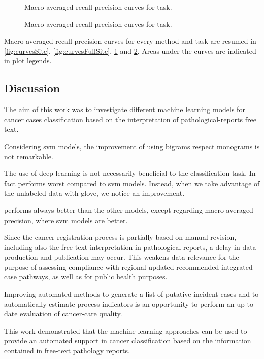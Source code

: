 \begin{figure}
  \centering
  \resizebox{0.9\textwidth}{!}{}
  \caption{Macro-averaged recall-precision curves for \type{} task.}
  \label{fig:curvesType}
\end{figure}

\begin{figure}
  \centering
  \resizebox{0.9\textwidth}{!}{}
  \caption{Macro-averaged recall-precision curves for \behaviour{} task.}
  \label{fig:curvesBehaviour}
\end{figure}

Macro-averaged recall-precision curves for every method and task are
resumed in \cref{fig:curvesSite}, \cref{fig:curvesFullSite},
\cref{fig:curvesType} and
\cref{fig:curvesBehaviour}. Areas under the curves are indicated in
plot legends.

\subsection{Discussion}
The aim of this work was to investigate different machine learning
models for cancer cases classification based on the interpretation
of pathological-reports free text.

Considering \ac{svm} models, the improvement of using
bigrams respect monograms is not remarkable.

The use of deep learning is not necessarily beneficial to the
classification task. In fact \lstmng{}
performs worst compared to \ac{svm} models. Instead, when we take
advantage of the unlabeled data with \ac{glove}, we notice an
improvement.

\lstmb{} performs always better than the other models, except
regarding macro-averaged precision, where \ac{svm} models are better.

Since the cancer registration process is partially based on manual
revision, including also the free text interpretation in pathological
reports, a delay in data production and publication may occur. This
weakens data relevance for the purpose of assessing compliance with
regional updated recommended integrated case pathways, as well as for
public health purposes.

Improving automated methods to generate a list of putative incident
cases and to automatically estimate process indicators is an
opportunity to perform an up-to-date evaluation of cancer-care
quality.

This work demonstrated that the machine learning approaches can be
used to provide an automated support in cancer classification based on
the information contained in free-text pathology reports.

